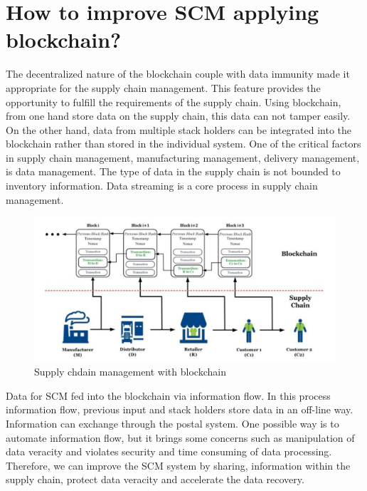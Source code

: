 \section{How to improve SCM applying blockchain? }
The decentralized nature of the blockchain couple with data immunity made it appropriate for the supply chain management.
This feature provides the opportunity to fulfill the requirements of the supply chain.  
Using blockchain, from one hand store data on the supply chain, this data can not tamper easily. On the other hand, data from multiple stack holders can be integrated into the blockchain rather than stored in the individual system.
One of the critical factors in supply chain management, manufacturing management, delivery management, is data management. The type of data in the supply chain is not bounded to inventory information. Data streaming is a core process in supply chain management.
\begin{center}
	
	\begin{figure}[htb!]
		
		\begin{minipage}{0.55\linewidth}
			
			\includegraphics[width=1.85\textwidth]{images/chap03_SupplyChain_blockchain.png}
		\end{minipage}
		\caption{Supply chdain management with blockchain\cite{Nazmul}}
		
	\end{figure}
	
\end{center}
Data for SCM fed into the blockchain via information flow. In this process information flow, previous input and stack holders store data in an off-line way. Information can exchange through the postal system. One possible way is to automate information flow, but it brings some concerns such as manipulation of data veracity and violates security and time consuming of data processing. Therefore, we can improve the SCM system by sharing, information within the supply chain, protect data veracity and accelerate the data recovery.\\
